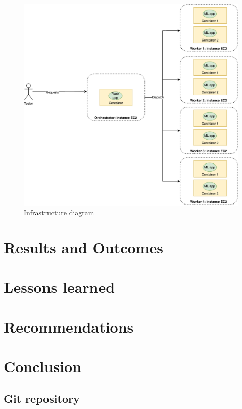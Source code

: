 \documentclass[letterpaper,headings=standardclasses,parskip=half]{scrartcl}
\newcommand{\todo}{{\color{red}{TODO}}}
\begin{document}
\begin{figure}
    \centering
    \includegraphics[width=\textwidth]{../report/images/infra.pdf}
    \caption{Infrastructure diagram}
    \label{fig:infra}
\end{figure}

\section{Results and Outcomes}

\todo

\section{Lessons learned}

\todo

\section{Recommendations}

\todo

\section{Conclusion}

\todo


\subsection*{Git repository}
\end{document}
